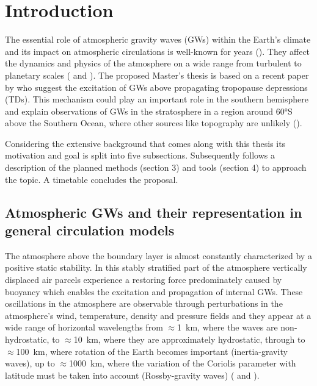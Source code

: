 \chapter{Introduction}
\label{sec:intro} 

The essential role of atmospheric gravity waves (GWs) within the Earth's climate and its impact on atmospheric circulations is well-known for years (\cite{fritts_gravity_2003}). They affect the dynamics and physics of the atmosphere on a wide range from turbulent to planetary scales (\cite{plougonven_how_2020} and \cite{williams_census_2017}). The proposed Master's thesis is based on a recent paper by \textcite{dornbrack_stratospheric_2022} who suggest the excitation of GWs above propagating tropopause depressions (TDs). This mechanism could play an important role in the southern hemisphere and explain observations of GWs in the stratosphere in a region around 60°S above the Southern Ocean, where other sources like topography are unlikely (\cite{hindley_18year_2020}).


Considering the extensive background that comes along with this thesis its motivation and goal is split into five subsections. Subsequently follows a description of the planned methods (section 3) and tools (section 4) to approach the topic. A timetable concludes the proposal. 

%
%
\section{Atmospheric GWs and their representation in general circulation models}
\label{subsec:GWs}
%
The atmosphere above the boundary layer is almost constantly characterized by a positive static stability. In this stably stratified part of the atmosphere vertically displaced air parcels experience a restoring force predominately caused by buoyancy which enables the excitation and propagation of internal GWs. These oscillations in the atmosphere are observable through perturbations in the atmosphere's wind, temperature, density and pressure fields and they appear at a wide range of horizontal wavelengths from $\approx$\SI{1}{\kilo\meter}, where the waves are non-hydrostatic, to $\approx$\SI{10}{\kilo\meter}, where they are approximately hydrostatic, through to $\approx$\SI{100}{\kilo\meter}, where rotation of the Earth becomes important (inertia-gravity waves), up to $\approx$\SI{1000}{\kilo\meter}, where the variation of the Coriolis parameter with latitude must be taken into account (Rossby-gravity waves)
(\cite{teixeira_physics_2014} and \cite{gill_atmosphere-ocean_1982}).

